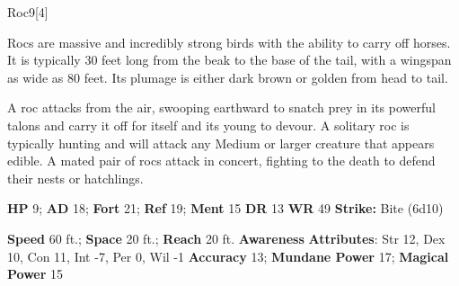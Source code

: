   
  \begin{monsection}{Roc}{9}[4]
    \vspace{-1em}\vspace{-1em}
    \vspace{0em}

    
      Rocs are massive and incredibly strong birds with the ability to carry off horses.
      It is typically 30 feet long from the beak to the base of the tail, with a wingspan as wide as 80 feet.
      Its plumage is either dark brown or golden from head to tail.

      A roc attacks from the air, swooping earthward to snatch prey in its powerful talons and carry it off for itself and its young to devour.
      A solitary roc is typically hunting and will attack any Medium or larger creature that appears edible.
      A mated pair of rocs attack in concert, fighting to the death to defend their nests or hatchlings.
    

    \begin{spellcontent}
      \begin{spelltargetinginfo}
        \pari \textbf{HP} 9;
          \textbf{AD} 18;
          \textbf{Fort} 21;
          \textbf{Ref} 19;
          \textbf{Ment} 15
        \pari \textbf{DR} 13
        \pari \textbf{WR} 49
        \pari \textbf{Strike:}
            Bite  (6d10)
      \end{spelltargetinginfo}
    \end{spellcontent}
    \begin{monsterfooter}
      \pari \textbf{Speed} 60 ft.;
        \textbf{Space} 20 ft.;
        \textbf{Reach} 20 ft.
      \pari \textbf{Awareness} 
      \pari \textbf{Attributes}:
        Str 12, Dex 10,
        Con 11, Int -7,
        Per 0, Wil -1
      \pari \textbf{Accuracy} 13;
        \textbf{Mundane Power} 17;
      \textbf{Magical Power} 15
    \end{monsterfooter}
  \end{monsection}
  
